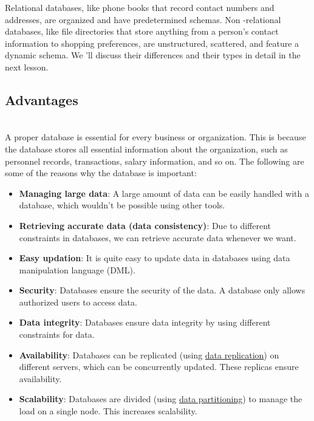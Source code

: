 Relational databases, like phone books that record contact numbers and addresses, are organized and have predetermined schemas. Non -relational databases, like file directories that store anything from a person's contact information to shopping preferences, are unstructured, scattered, and feature a dynamic schema. We
'll discuss their differences and their types in detail in the next lesson.

\subsection{Advantages}\label{1ZKn6rFtnPb7hDnxhY9__}
\\
A proper database is essential for every business or organization. This is because the database stores all essential information about the organization, such as personnel records, transactions, salary information, and so on. The following are some of the reasons why the database is important:

\begin{itemize}
\item
\protect{}\label{-LWDdjvLLR7kRwssOOfk4}
\textbf{Managing large data}: A large amount of data can be easily handled with a database, which wouldn't be possible using other tools.
\item
\protect{}\label{6vm3aqgt0TnSQvrFmG7_J}
\textbf{Retrieving accurate data (data consistency)}: Due to different constraints in databases, we can retrieve accurate data whenever we want.
\item
\protect{}\label{JluO0mYdN9n8FOFrggeVO}
\textbf{Easy updation}: It is quite easy to update data in databases using data manipulation language (DML).
\item
\protect{}\label{zVIOKorKR8-aySV1EQ2Po}
\textbf{Security}: Databases ensure the security of the data. A database only allows authorized users to access data.
\item
\protect{}\label{AopAHE66MHfQZPO0BF6me}
\textbf{Data integrity}: Databases ensure data integrity by using different constraints for data.
\item
\protect{}\label{QDELUSsE1LQT1hSLYsslx}
\textbf{Availability}: Databases can be replicated (using \href{https://www.educative.io/courses/grokking-the-system-design-interview/data-replication}{data replication}) on different servers, which can be concurrently updated. These replicas ensure availability.
\item
\protect{}\label{KZ8Xd7eoEfpLm38jCz1Ky}
\textbf{Scalability}: Databases are divided (using \href{https://www.educative.io/courses/grokking-the-system-design-interview/data-partitioning}{data partitioning}) to manage the load on a single node. This increases scalability.
\end{itemize}

